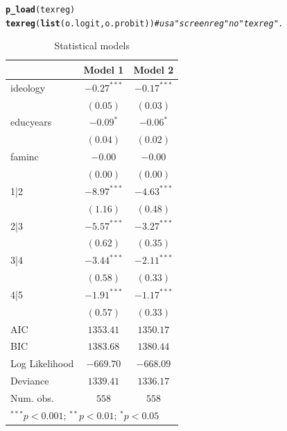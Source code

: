 \documentclass[onesided]{article}\usepackage[]{graphicx}\usepackage[]{color}
\makeatletter
\newcommand{\hlcom}[1]{\textcolor[rgb]{0.678,0.584,0.686}{\textit{#1}}}%
\newcommand{\hlstd}[1]{\textcolor[rgb]{0.345,0.345,0.345}{#1}}%
\newcommand{\hlkwd}[1]{\textcolor[rgb]{0.737,0.353,0.396}{\textbf{#1}}}%
\newenvironment{kframe}{%
 \def\at@end@of@kframe{}%
 \ifinner\ifhmode%
  \def\at@end@of@kframe{\end{minipage}}%
  \begin{minipage}{\columnwidth}%
 \fi\fi%
 \def\FrameCommand##1{\hskip\@totalleftmargin \hskip-\fboxsep
 \colorbox{shadecolor}{##1}\hskip-\fboxsep
     \hskip-\linewidth \hskip-\@totalleftmargin \hskip\columnwidth}%
 \MakeFramed {\advance\hsize-\width
   \@totalleftmargin\z@ \linewidth\hsize
   \@setminipage}}%
 {\par\unskip\endMakeFramed%
 \at@end@of@kframe}
\makeatother
\begin{document}
\begin{kframe}
\begin{alltt}
\hlkwd{p_load}\hlstd{(texreg)}
\hlkwd{texreg}\hlstd{(}\hlkwd{list}\hlstd{(o.logit, o.probit))} \hlcom{# usa "screenreg" no "texreg".}
\end{alltt}
\end{kframe}
\begin{table}
\begin{center}
\begin{tabular}{l c c}
\hline
 & Model 1 & Model 2 \\
\hline
ideology       & $-0.27^{***}$ & $-0.17^{***}$ \\
               & $(0.05)$      & $(0.03)$      \\
educyears      & $-0.09^{*}$   & $-0.06^{*}$   \\
               & $(0.04)$      & $(0.02)$      \\
faminc         & $-0.00$       & $-0.00$       \\
               & $(0.00)$      & $(0.00)$      \\
1|2            & $-8.97^{***}$ & $-4.63^{***}$ \\
               & $(1.16)$      & $(0.48)$      \\
2|3            & $-5.57^{***}$ & $-3.27^{***}$ \\
               & $(0.62)$      & $(0.35)$      \\
3|4            & $-3.44^{***}$ & $-2.11^{***}$ \\
               & $(0.58)$      & $(0.33)$      \\
4|5            & $-1.91^{***}$ & $-1.17^{***}$ \\
               & $(0.57)$      & $(0.33)$      \\
\hline
AIC            & $1353.41$     & $1350.17$     \\
BIC            & $1383.68$     & $1380.44$     \\
Log Likelihood & $-669.70$     & $-668.09$     \\
Deviance       & $1339.41$     & $1336.17$     \\
Num. obs.      & $558$         & $558$         \\
\hline
\multicolumn{3}{l}{\scriptsize{$^{***}p<0.001$; $^{**}p<0.01$; $^{*}p<0.05$}}
\end{tabular}
\caption{Statistical models}
\label{table:coefficients}
\end{center}
\end{table}
\end{document}
